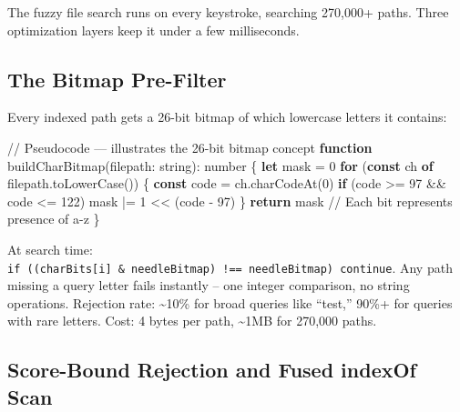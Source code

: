 \documentclass[
  english,
  11pt,
  letterpaper,
]{book}
\newenvironment{Shaded}{\begin{snugshade}}{\end{snugshade}}
\newcommand{\CommentTok}[1]{\textcolor[rgb]{0.37,0.37,0.37}{#1}}
\newcommand{\ControlFlowTok}[1]{\textcolor[rgb]{0.00,0.23,0.31}{\textbf{#1}}}
\newcommand{\DataTypeTok}[1]{\textcolor[rgb]{0.68,0.00,0.00}{#1}}
\newcommand{\DecValTok}[1]{\textcolor[rgb]{0.68,0.00,0.00}{#1}}
\newcommand{\FunctionTok}[1]{\textcolor[rgb]{0.28,0.35,0.67}{#1}}
\newcommand{\KeywordTok}[1]{\textcolor[rgb]{0.00,0.23,0.31}{\textbf{#1}}}
\newcommand{\NormalTok}[1]{\textcolor[rgb]{0.00,0.23,0.31}{#1}}
\newcommand{\OperatorTok}[1]{\textcolor[rgb]{0.37,0.37,0.37}{#1}}
\begin{document}
The fuzzy file search runs on every keystroke, searching 270,000+ paths.
Three optimization layers keep it under a few milliseconds.

\subsection{The Bitmap Pre-Filter}\label{the-bitmap-pre-filter}

Every indexed path gets a 26-bit bitmap of which lowercase letters it
contains:

\begin{Shaded}
\begin{Highlighting}[]
\CommentTok{// Pseudocode — illustrates the 26{-}bit bitmap concept}
\KeywordTok{function} \FunctionTok{buildCharBitmap}\NormalTok{(filepath}\OperatorTok{:} \DataTypeTok{string}\NormalTok{)}\OperatorTok{:} \DataTypeTok{number}\NormalTok{ \{}
  \KeywordTok{let}\NormalTok{ mask }\OperatorTok{=} \DecValTok{0}
  \ControlFlowTok{for}\NormalTok{ (}\KeywordTok{const}\NormalTok{ ch }\KeywordTok{of}\NormalTok{ filepath}\OperatorTok{.}\FunctionTok{toLowerCase}\NormalTok{()) \{}
    \KeywordTok{const}\NormalTok{ code }\OperatorTok{=}\NormalTok{ ch}\OperatorTok{.}\FunctionTok{charCodeAt}\NormalTok{(}\DecValTok{0}\NormalTok{)}
    \ControlFlowTok{if}\NormalTok{ (code }\OperatorTok{\textgreater{}=} \DecValTok{97} \OperatorTok{\&\&}\NormalTok{ code }\OperatorTok{\textless{}=} \DecValTok{122}\NormalTok{) mask }\OperatorTok{|=} \DecValTok{1} \OperatorTok{\textless{}\textless{}}\NormalTok{ (code }\OperatorTok{{-}} \DecValTok{97}\NormalTok{)}
\NormalTok{  \}}
  \ControlFlowTok{return}\NormalTok{ mask  }\CommentTok{// Each bit represents presence of a{-}z}
\NormalTok{\}}
\end{Highlighting}
\end{Shaded}

At search time:
\texttt{if\ ((charBits{[}i{]}\ \&\ needleBitmap)\ !==\ needleBitmap)\ continue}.
Any path missing a query letter fails instantly -- one integer
comparison, no string operations. Rejection rate: \textasciitilde10\%
for broad queries like ``test,'' 90\%+ for queries with rare letters.
Cost: 4 bytes per path, \textasciitilde1MB for 270,000 paths.

\subsection{Score-Bound Rejection and Fused indexOf
Scan}\label{score-bound-rejection-and-fused-indexof-scan}
\end{document}
